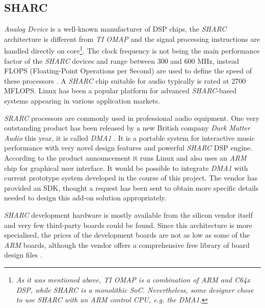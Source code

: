 \subsection{SHARC}

  \emph{Analog Device} is a well-known manufacturer of DSP chips, the
 \emph{SHARC} architecture is different from \emph{TI OMAP} and the
 signal processing instructions are handled directly on core\footnote{%
 \emph{As it was mentioned above, TI OMAP is a combination of ARM and
 C64x DSP, while SHARC is a monolithic SoC. Nevertheless, some designer
 chose to use SHARC with an ARM control CPU, e.g. the DMA1.}}.
 The clock frequency is not being the main performance factor of the
 \emph{SHARC} devices and range between 300 and 600 MHz, instead FLOPS
 (Floating-Point Operations per Second) are used to define the speed of
 these processors \cite{links:adi:sharc}. A \emph{SHARC} chip suitable
 for audio typically is rated at 2700 MFLOPS.
 Linux has been a popular platform for advanced \emph{SHARC}-based systems
 appearing in various application markets. %


  \emph{SRARC} processors are commonly used in professional audio
 equipment. One very outstanding product has been released by
 a new British company \emph{Dark Matter Audio} this year, it is
 called \emph{DMA1} \cite{links:dma1}.
 It is a portable  system for interactive music performance with
 very novel design features and powerful \emph{SHARC} DSP engine.
 According to the product announcement it runs Linux and also
 uses an \emph{ARM} chip for graphical user interface. It would be
 possible to integrate \emph{DMA1} with current prototype system
 developed in the course of this project. The vendor has provided
 an SDK, thought a request has been sent to obtain more specific
 details needed to design this add-on solution appropriately.


  \emph{SHARC} development hardware is mostly available from the
 silicon vendor itself and very few third-party boards could be found.
 Since this architecture is more specialised, the prices of the 
 development boards are not as low as some of the \emph{ARM} boards,
 although the vendor offers a comprehensive free library of board
 design files \cite{links:adi:freepcb}.


